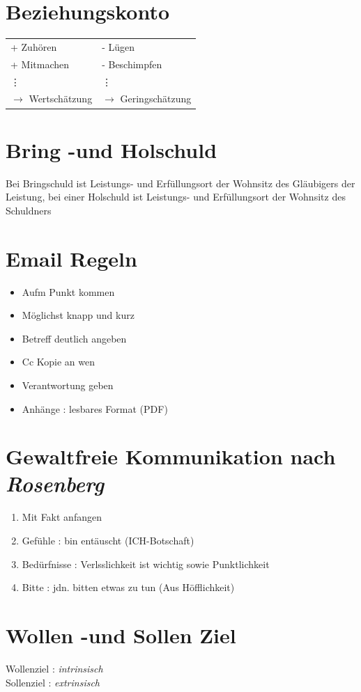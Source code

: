 \documentclass[11pt,a4paper]{article}
\begin{document}
\section*{Beziehungskonto}
\begin{tabular}{|l || l|} 
\hline \hline
+ Zuhören & - Lügen\\
+ Mitmachen & - Beschimpfen\\
\vdots & \vdots\\
$\rightarrow$ Wertschätzung & $\rightarrow$ Geringschätzung\\
\hline

\end{tabular}
\section*{Bring -und Holschuld}
Bei Bringschuld ist Leistungs- und Erfüllungsort der Wohnsitz des Gläubigers der Leistung, bei einer Holschuld ist Leistungs- und Erfüllungsort der Wohnsitz des Schuldners

\section*{Email Regeln}
\begin{itemize}
\item Aufm Punkt kommen
\item Möglichst knapp und kurz 
\item Betreff deutlich angeben
\item Cc Kopie an wen
\item Verantwortung geben
\item Anhänge : lesbares Format (PDF)

\end{itemize}
\section*{Gewaltfreie Kommunikation nach \textit{Rosenberg}}
\begin{enumerate}
\item Mit Fakt anfangen
\item Gefühle : bin entäuscht (ICH-Botschaft)
\item Bedürfnisse : Verlsslichkeit ist wichtig sowie Punktlichkeit
\item Bitte : jdn. bitten etwas zu tun (Aus Höfflichkeit)
\end{enumerate}
\section*{Wollen -und Sollen Ziel}
Wollenziel : \textit{intrinsisch} \\
Sollenziel : \textit{extrinsisch}
\end{document}
